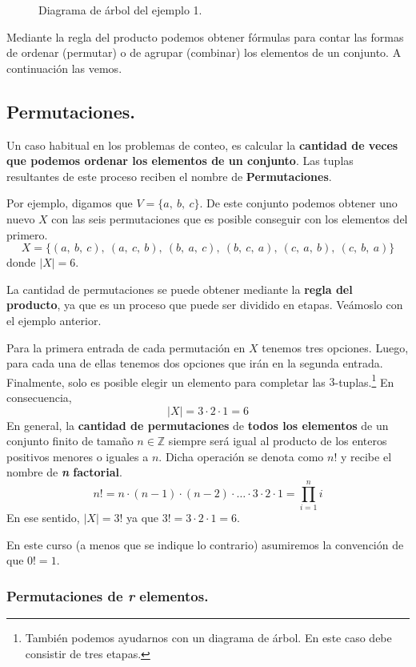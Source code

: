 \documentclass[12pt]{article}
\begin{document}
\begin{figure}[hbt!]
\caption{Diagrama de árbol del ejemplo 1.}

\end{figure}

Mediante la regla del producto podemos obtener fórmulas para contar las formas de ordenar (permutar) o de agrupar (combinar) los elementos de un conjunto. A continuación las vemos.

\subsection{Permutaciones.}

Un caso habitual en los problemas de conteo, es calcular la \textbf{cantidad de veces que podemos ordenar los elementos de un conjunto}. Las tuplas resultantes de este proceso reciben el nombre de \textbf{Permutaciones}.

Por ejemplo, digamos que $V = \{a, \ b, \ c\}$. De este conjunto podemos obtener uno nuevo $X$ con las seis permutaciones que es posible conseguir con los elementos del primero.
\[
  X = \{(a, \ b, \ c), \ (a, \ c, \ b), \ (b, \ a, \ c), \ (b, \ c, \ a), \ (c, \ a, \ b), \ (c, \ b, \ a)\}
\]
donde $|X| = 6$.

La cantidad de permutaciones se puede obtener mediante la \textbf{regla del producto}, ya que es un proceso que puede ser dividido en etapas. Veámoslo con el ejemplo anterior.

Para la primera entrada de cada permutación en $X$ tenemos tres opciones. Luego, para cada una de ellas tenemos dos opciones que irán en la segunda entrada. Finalmente, solo es posible elegir un elemento para completar las $3$-tuplas.\footnote{También podemos ayudarnos con un diagrama de árbol. En este caso debe consistir de tres etapas.} En consecuencia,
\[
  |X| = 3 \cdot 2 \cdot 1 = 6
\]
En general, la \textbf{cantidad de permutaciones} de \textbf{todos los elementos} de un conjunto finito de tamaño $n \in \mathbb{Z}$ siempre será igual al producto de los enteros positivos menores o iguales a $n$. Dicha operación se denota como $n!$ y recibe el nombre de \textbf{\textit{n} factorial}.
\[
  n! = n \cdot (n - 1) \cdot (n - 2) \cdot \ldots \cdot 3 \cdot 2 \cdot 1 = \prod_{i = 1}^{n} i
\]
En ese sentido, $|X| = 3!$ ya que $3! = 3 \cdot 2 \cdot 1 = 6$.

En este curso (a menos que se indique lo contrario) asumiremos la convención de que $0! = 1$.

\subsubsection{Permutaciones de \textit{r} elementos.}
\end{document}
